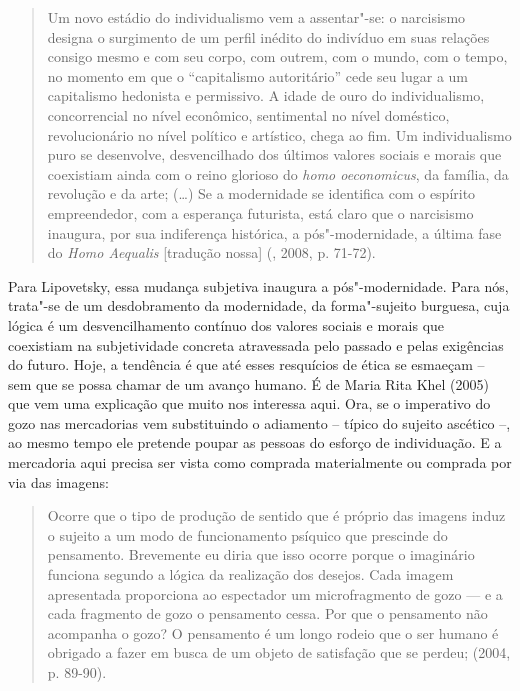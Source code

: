 \begin{quote}
Um novo estádio do individualismo vem a assentar"-se: o narcisismo
designa o surgimento de um perfil inédito do indivíduo em suas relações
consigo mesmo e com seu corpo, com outrem, com o mundo, com o tempo, no
momento em que o ``capitalismo autoritário'' cede seu lugar a um
capitalismo hedonista e permissivo. A idade de ouro do individualismo,
concorrencial no nível econômico, sentimental no nível doméstico,
revolucionário no nível político e artístico, chega ao fim. Um
individualismo puro se desenvolve, desvencilhado dos últimos valores
sociais e morais que coexistiam ainda com o reino glorioso do \emph{homo
oeconomicus}, da família, da revolução e da arte; (\ldots{}) Se a modernidade
se identifica com o espírito empreendedor, com a esperança futurista,
está claro que o narcisismo inaugura, por sua indiferença histórica, a
pós"-modernidade, a última fase do \emph{Homo Aequalis} [tradução
nossa] (, 2008, p. 71-72).
\end{quote}

Para Lipovetsky, essa mudança subjetiva inaugura a pós"-modernidade. Para
nós, trata"-se de um desdobramento da modernidade, da forma"-sujeito
burguesa, cuja lógica é um desvencilhamento contínuo dos valores sociais
e morais que coexistiam na subjetividade concreta atravessada pelo
passado e pelas exigências do futuro. Hoje, a tendência é que até esses
resquícios de ética se esmaeçam -- sem que se possa chamar de um avanço
humano. É de Maria Rita Khel (2005) que vem uma explicação que muito nos
interessa aqui. Ora, se o imperativo do gozo nas mercadorias vem
substituindo o adiamento -- típico do sujeito ascético --, ao mesmo
tempo ele pretende poupar as pessoas do esforço de individuação. E a
mercadoria aqui precisa ser vista como comprada materialmente ou
comprada por via das imagens:

\begin{quote}
Ocorre que o tipo de produção de sentido que é próprio das imagens induz
o sujeito a um modo de funcionamento psíquico que prescinde do
pensamento. Brevemente eu diria que isso ocorre porque o imaginário
funciona segundo a lógica da realização dos desejos. Cada imagem
apresentada proporciona ao espectador um microfragmento de gozo --- e a
cada fragmento de gozo o pensamento cessa. Por que o pensamento não
acompanha o gozo? O pensamento é um longo rodeio que o ser humano é
obrigado a fazer em busca de um objeto de satisfação que se perdeu;
(2004, p. 89-90).
\end{quote}

